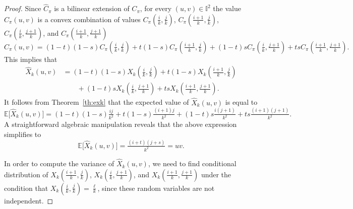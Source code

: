 \documentclass[10pt,a4paper]{amsart}
\newcommand{\Chat}{\widehat{C}}
\newcommand{\EE}{\mathbb{E}}
\newcommand{\II}{\mathbb{I}}
\newcommand{\Xhat}{\widehat{X}}
\begin{document}
\begin{proof}
Since $\Chat_\pi$ is a bilinear extension of $C_\pi$, for every $(u,v) \in \II^2$ the value $\Chat_\pi(u,v)$ is a convex combination of values $C_\pi(\tfrac{i}{k},\tfrac{j}{k})$, $C_\pi(\tfrac{i+1}{k},\tfrac{j}{k})$, $C_\pi(\tfrac{i}{k},\tfrac{j+1}{k})$, and $C_\pi(\tfrac{i+1}{k},\tfrac{j+1}{k})$
$$\Chat_\pi(u,v) = (1-t)(1-s)C_\pi(\tfrac{i}{k},\tfrac{j}{k}) + t(1-s)C_\pi(\tfrac{i+1}{k},\tfrac{j}{k}) + (1-t)sC_\pi(\tfrac{i}{k},\tfrac{j+1}{k}) +tsC_\pi(\tfrac{i+1}{k},\tfrac{j+1}{k}).$$
This implies that
\begin{align*}
    \Xhat_k(u,v) &= (1-t)(1-s)X_k(\tfrac{i}{k},\tfrac{j}{k}) + t(1-s)X_k(\tfrac{i+1}{k},\tfrac{j}{k}) \\
    & \qquad + (1-t)sX_k(\tfrac{i}{k},\tfrac{j+1}{k}) +tsX_k(\tfrac{i+1}{k},\tfrac{j+1}{k}).
\end{align*}
It follows from Theorem~\ref{th:exk} that the expected value of $\Xhat_k(u,v)$ is equal to
$$ \EE\big[\Xhat_k(u,v)\big] = (1-t)(1-s)\tfrac{ij}{k^2} + t(1-s)\tfrac{(i+1)j}{k^2} + (1-t)s\tfrac{i(j+1)}{k^2} +ts\tfrac{(i+1)(j+1)}{k^2}. $$
A straightforward algebraic manipulation reveals that the above expression simplifies to
$$ \EE\big[\Xhat_k(u,v)\big] =  \tfrac{(i+t)(j+s)}{k^2} = uv. $$

In order to compute the variance of $\Xhat_k(u,v)$, we need to find conditional distribution of  $X_k(\tfrac{i+1}{k},\tfrac{j}{k})$, $X_k(\tfrac{i}{k},\tfrac{j+1}{k})$, and $X_k(\tfrac{i+1}{k},\tfrac{j+1}{k})$ under the condition that $X_k(\tfrac{i}{k},\tfrac{j}{k}) = \tfrac{\ell}{k}$, since these random variables are not independent. 


\end{proof}
\end{document}
